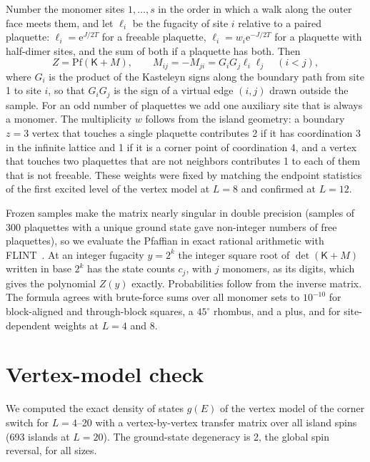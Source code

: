 \documentclass[reprint,aps,prb,floatfix,longbibliography,amsmath,amssymb]{revtex4-2}
\newcommand{\ee}{\mathrm{e}}
\newcommand{\Kas}{\mathsf{K}}
\begin{document}
Number the monomer sites $1,\dots,s$ in the order in which a walk along the outer face meets them, and let $\ell_i$ be the fugacity of site $i$ relative to a paired plaquette: $\ell_i=\ee^{J/2T}$ for a freeable plaquette, $\ell_i=w_i\ee^{-J/2T}$ for a plaquette with half-dimer sites, and the sum of both if a plaquette has both. Then~\cite{Giuliani2016}
\begin{equation}
  Z=\mathrm{Pf}(\Kas+M),\qquad M_{ij}=-M_{ji}=G_iG_j\ell_i\ell_j\quad(i<j),
\end{equation}
where $G_i$ is the product of the Kasteleyn signs along the boundary path from site 1 to site $i$, so that $G_iG_j$ is the sign of a virtual edge $(i,j)$ drawn outside the sample. For an odd number of plaquettes we add one auxiliary site that is always a monomer. The multiplicity $w$ follows from the island geometry: a boundary $z=3$ vertex that touches a single plaquette contributes 2 if it has coordination 3 in the infinite lattice and 1 if it is a corner point of coordination 4, and a vertex that touches two plaquettes that are not neighbors contributes 1 to each of them that is not freeable. These weights were fixed by matching the endpoint statistics of the first excited level of the vertex model at $L=8$ and confirmed at $L=12$.

Frozen samples make the matrix nearly singular in double precision (samples of 300 plaquettes with a unique ground state gave non-integer numbers of free plaquettes), so we evaluate the Pfaffian in exact rational arithmetic with FLINT~\cite{flint}. At an integer fugacity $y=2^k$ the integer square root of $\det(\Kas+M)$ written in base $2^k$ has the state counts $c_j$, with $j$ monomers, as its digits, which gives the polynomial $Z(y)$ exactly. Probabilities follow from the inverse matrix. The formula agrees with brute-force sums over all monomer sets to $10^{-10}$ for block-aligned and through-block squares, a $45^\circ$ rhombus, and a plus, and for site-dependent weights at $L=4$ and 8.

\section{Vertex-model check}\label{app:vertex}

We computed the exact density of states $g(E)$ of the vertex model of the corner switch for $L=4$--20 with a vertex-by-vertex transfer matrix over all island spins (693 islands at $L=20$). The ground-state degeneracy is 2, the global spin reversal, for all sizes.
\end{document}
